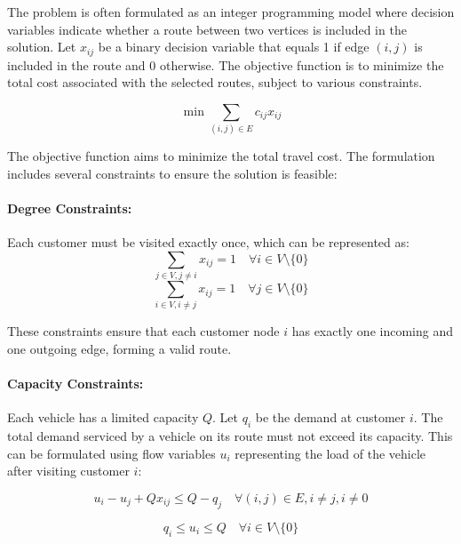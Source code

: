 \documentclass[
]{article}
\begin{document}
The problem is often formulated as an integer programming model where decision variables indicate whether a route between two vertices is included in the solution. Let \( x_{ij} \) be a binary decision variable that equals 1 if edge \( (i, j) \) is included in the route and 0 otherwise. The objective function is to minimize the total cost associated with the selected routes, subject to various constraints.

\begin{equation}
  \min \sum_{(i,j) \in E} c_{ij} x_{ij}
\end{equation}

The objective function aims to minimize the total travel cost. The formulation includes several constraints to ensure the solution is feasible:

\paragraph{Degree Constraints:}
Each customer must be visited exactly once, which can be represented as:
\begin{equation}
  \sum_{j \in V, j \neq i} x_{ij} = 1 \quad \forall i \in V \setminus \{0\}
\end{equation}
\begin{equation}
  \sum_{i \in V, i \neq j} x_{ij} = 1 \quad \forall j \in V \setminus \{0\}
\end{equation}

These constraints ensure that each customer node \( i \) has exactly one incoming and one outgoing edge, forming a valid route.

\paragraph{Capacity Constraints:}
Each vehicle has a limited capacity \( Q \). Let \( q_i \) be the demand at customer \( i \). The total demand serviced by a vehicle on its route must not exceed its capacity. This can be formulated using flow variables \( u_i \) representing the load of the vehicle after visiting customer \( i \):

\begin{equation}
  u_i - u_j + Q x_{ij} \leq Q - q_j \quad \forall (i, j) \in E, i \neq j, i \neq 0
\end{equation}

\begin{equation}
  q_i \leq u_i \leq Q \quad \forall i \in V \setminus \{0\}
\end{equation}
\end{document}
